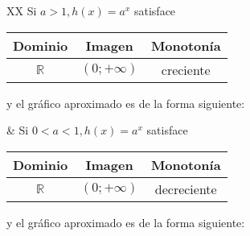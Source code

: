 \documentclass[Análisis.root.tex]{subfiles}
\newcommand{\R}{\mathbb{R}}
\begin{document}
        \begin{tabularx}{\textwidth}{XX}
            Si \(a>1, h(x)=a^x\) satisface
            \begin{center}
                \begin{tabular}{|c|c|c|}
                    \hline
                    Dominio & Imagen & Monotonía\\\hline
                    \(\R\) & \((0;+\infty)\) & creciente\\
                    \hline
                \end{tabular}
            \end{center}
            y el gráfico aproximado es de la forma siguiente:
            \begin{center}
            \end{center} 
            &
            Si \(0<a<1, h(x)=a^x\) satisface
            \begin{center}
                \begin{tabular}{|c|c|c|}
                    \hline
                    Dominio & Imagen & Monotonía\\\hline
                    \(\R\) & \((0;+\infty)\) & decreciente\\
                    \hline
                \end{tabular}
            \end{center}
            y el gráfico aproximado es de la forma siguiente:
            \begin{center}
            \end{center} 
        \end{tabularx}
\end{document}
